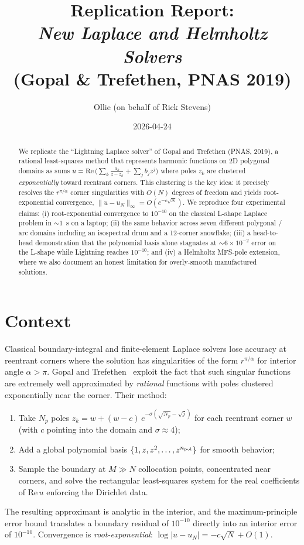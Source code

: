 \documentclass[11pt]{article}
\title{Replication Report: \\
\emph{New Laplace and Helmholtz Solvers} \\
(Gopal \& Trefethen, PNAS 2019)}
\author{Ollie (on behalf of Rick Stevens)}
\date{2026-04-24}
\begin{document}
\maketitle

\begin{abstract}
We replicate the ``Lightning Laplace solver'' of Gopal and Trefethen (PNAS, 2019),
a rational least-squares method that represents harmonic functions on 2D polygonal
domains as sums $u = \mathrm{Re}\,\bigl(\sum_k \tfrac{a_k}{z-z_k} + \sum_j b_j z^j\bigr)$
where poles $z_k$ are clustered \emph{exponentially} toward reentrant corners. This
clustering is the key idea: it precisely resolves the $r^{\pi/\alpha}$ corner
singularities with $O(N)$ degrees of freedom and yields root-exponential
convergence, $\|u-u_N\|_\infty = O(e^{-c\sqrt{N}})$. We reproduce four experimental
claims: (i) root-exponential convergence to $10^{-10}$ on the classical L-shape
Laplace problem in $\sim\!1$~s on a laptop; (ii) the same behavior across seven
different polygonal / arc domains including an isospectral drum and a 12-corner
snowflake; (iii) a head-to-head demonstration that the polynomial basis alone
stagnates at $\sim\!6\times10^{-2}$ error on the L-shape while Lightning reaches
$10^{-10}$; and (iv) a Helmholtz MFS-pole extension, where we also document an
honest limitation for overly-smooth manufactured solutions.
\end{abstract}

\section{Context}
\label{sec:context}

Classical boundary-integral and finite-element Laplace solvers lose accuracy at
reentrant corners where the solution has singularities of the form
$r^{\pi/\alpha}$ for interior angle $\alpha > \pi$. Gopal and
Trefethen~\cite{gopal2019} exploit the fact that such singular functions are
extremely well approximated by \emph{rational} functions with poles clustered
exponentially near the corner. Their method:
\begin{enumerate}
  \item Take $N_p$ poles $z_k = w + (w-c)\,e^{-\sigma(\sqrt{N_p}-\sqrt{j})}$ for
        each reentrant corner $w$ (with $c$ pointing into the domain and
        $\sigma \approx 4$);
  \item Add a global polynomial basis $\{1,z,z^2,\dots,z^{n_{\rm pol}}\}$ for
        smooth behavior;
  \item Sample the boundary at $M \gg N$ collocation points, concentrated near
        corners, and solve the rectangular least-squares system for the real
        coefficients of $\mathrm{Re}\,u$ enforcing the Dirichlet data.
\end{enumerate}
The resulting approximant is analytic in the interior, and the maximum-principle
error bound translates a boundary residual of $10^{-10}$ directly into an
interior error of $10^{-10}$. Convergence is \emph{root-exponential}:
$\log|u-u_N| = -c\sqrt{N} + O(1)$.
\end{document}
